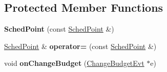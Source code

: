 \subsection*{Protected Member Functions}
\begin{DoxyCompactItemize}
\item 
{\bfseries Sched\+Point} (const \hyperlink{classRTSim_1_1SchedPoint}{Sched\+Point} \&)\hypertarget{classRTSim_1_1SchedPoint_a193150bbf219b097e5acb1003b96d3c8}{}\label{classRTSim_1_1SchedPoint_a193150bbf219b097e5acb1003b96d3c8}

\item 
\hyperlink{classRTSim_1_1SchedPoint}{Sched\+Point} \& {\bfseries operator=} (const \hyperlink{classRTSim_1_1SchedPoint}{Sched\+Point} \&)\hypertarget{classRTSim_1_1SchedPoint_a0b354fa27c794b1646ce38f5642e1093}{}\label{classRTSim_1_1SchedPoint_a0b354fa27c794b1646ce38f5642e1093}

\item 
void {\bfseries on\+Change\+Budget} (\hyperlink{classRTSim_1_1SchedPoint_1_1ChangeBudgetEvt}{Change\+Budget\+Evt} $\ast$e)\hypertarget{classRTSim_1_1SchedPoint_a5949cb5bce798892ef5374d84a77ea6a}{}\label{classRTSim_1_1SchedPoint_a5949cb5bce798892ef5374d84a77ea6a}

\end{DoxyCompactItemize}
